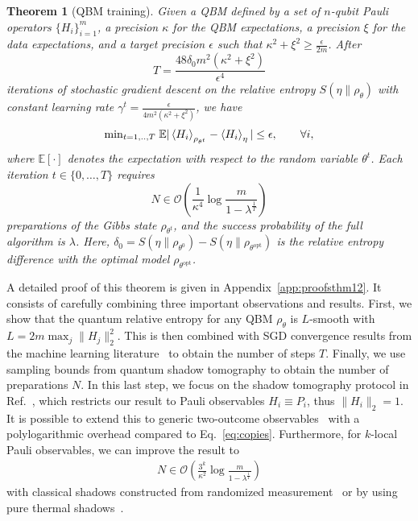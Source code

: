 \documentclass[
    aps,
    prx,
    floatfix,
    nofootinbib,
    onecolumn
]{revtex4-2}
\newtheorem{theorem}{Theorem}
\begin{document}
\begin{theorem}[QBM training]
\label{thm:training}
Given a QBM defined by a set of $n$-qubit Pauli operators $\{H_i\}_{i=1}^m$, a precision $\kappa$ for the QBM expectations, a precision $\xi$ for the data expectations, and a target precision $\epsilon$ such that $\kappa^2 + \xi^2 \geq \frac{\epsilon}{2m}$. After 
\begin{equation}
\label{eq:trainingsteps}
T = \frac{48\delta_0 m^2  (\kappa^2 + \xi^2 )}{\epsilon^4}
\end{equation} 
iterations of stochastic gradient descent on the relative entropy $S(\eta \|\rho_\theta)$ with constant learning rate $\gamma^t=\frac{\epsilon}{4m^2(\kappa^2+\xi^2)}$, we have
\begin{equation}
    \mathrm{min}_{t=1,..,T} \; \mathbb{E}| \expval{H_i}_{\rho_{\theta^t}}  - \expval{H_i}_\eta | \leq \epsilon, \qquad \forall i,
\end{equation} where $\mathbb{E}[\cdot]$ denotes the expectation with respect to the random variable $\theta^t$. 
Each iteration $t \in \{0, \dots, T\}$ requires
\begin{equation}
\label{eq:copies}
    N \in \mathcal{O} \left( \frac{1}{{\kappa^4}} \log \frac{ m} { 1-\lambda^{\frac{1}{T}} } \right)
\end{equation}
preparations of the Gibbs state $\rho_{\theta^t}$, and the success probability of the full algorithm is $\lambda$. Here, $\delta_0 = S(\eta\|\rho_{\theta^0})-S(\eta\|\rho_{\theta^\mathrm{opt}})$ is the relative entropy difference with the optimal model $\rho_{\theta^\mathrm{opt}}$.
\end{theorem}

A detailed proof of this theorem is given in Appendix~\ref{app:proofsthm12}. It consists of carefully combining three important observations and results. First, we show that the quantum relative entropy for any QBM $\rho_\theta$ is $L$-smooth with $L=2m\max_j \|H_j\|_2^2$. This is then combined with SGD convergence results from the machine learning literature~\cite{Khaled2020, Garrigos2023} to obtain the number of steps $T$. Finally, we use sampling bounds from quantum shadow tomography to obtain the number of preparations $N$. In this last step, we focus on the shadow tomography protocol in Ref.~\cite{Huang_2021}, which restricts our result to Pauli observables $H_i\equiv P_i$, thus $\|H_i\|_2 = 1$. It is possible to extend this to generic two-outcome observables~\cite{Aaronson_2017} with a polylogarithmic overhead compared to Eq.~\eqref{eq:copies}. Furthermore, for $k$-local Pauli observables, we can improve the result to 
\begin{align}
    N \in \mathcal{O}\left( \frac{3^k}{\kappa^2} \log \frac{ m} { 1-\lambda^{\frac{1}{T}} } \right)
\end{align}
with classical shadows constructed from randomized measurement~\cite{Huang2020} or by using pure thermal shadows~\cite{Coopmans_2023}.
\end{document}
